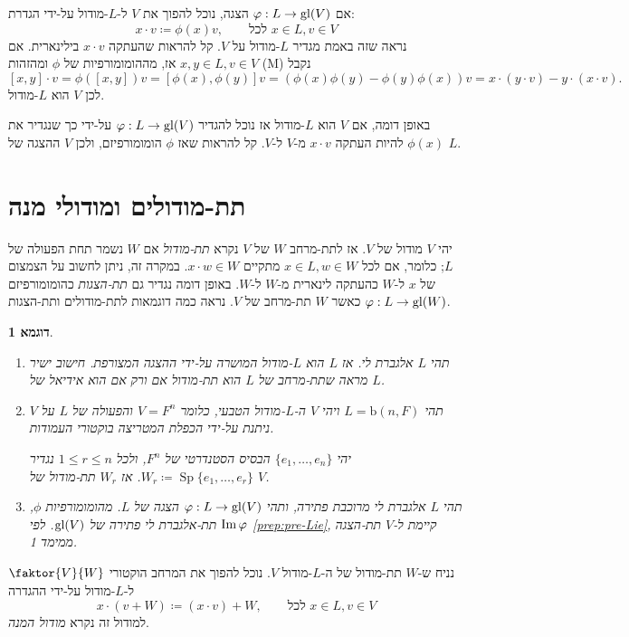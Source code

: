\documentclass{report}
\theoremstyle{break}
\newtheorem{example}[example]{דוגמא}
\theoremstyle{MyNonumberbreak}
\DeclareMathOperator{\Sp}{Sp}
\begin{document}
אם $\varphi : L \to \operatorname{gl}(V)$ הצגה, נוכל להפוך את $V$ ל-$L$-מודול על-ידי הגדרת:
\[ x \cdot v \coloneqq \phi(x)v, \qquad \text{לכל $x \in L, v \in V$} \]
נראה שזה באמת מגדיר $L$-מודול על $V$. קל להראות שהעתקה $x \cdot v$ בילינארית. אם $x, y \in L, v \in V$ אז, מההומומורפיות של $\phi$ ומהזהות (M) נקבל
\[ [x, y] \cdot v = \phi([x, y])v = [\phi(x), \phi(y)]v = (\phi(x)\phi(y) - \phi(y)\phi(x))v = x \cdot (y \cdot v) - y \cdot (x \cdot v). \]
לכן $V$ הוא $L$-מודול.

באופן דומה, אם $V$ הוא $L$-מודול אז נוכל להגדיר $\varphi : L \to \operatorname{gl}(V)$ על-ידי כך שנגדיר את $\phi(x)$ להיות העתקה $x \cdot v$ מ-$V$ ל-$V$. קל להראות שאז $\phi$ הומומורפיזם, ולכן $V$ ההצגה של $L$.

\section{תת-מודולים ומודולי מנה}
יהי $V$ מודול של $V$. אז לתת-מרחב $W$ של $V$ נקרא \textit{תת-מודול} אם $W$ נשמר תחת הפעולה של $L$; כלומר, אם לכל $x \in L, w \in W$ מתקיים $x \cdot w \in W$. במקרה זה, ניתן לחשוב על הצמצום של $x$ ל-$W$ כהעתקה לינארית מ-$W$ ל-$W$. באופן דומה נגדיר גם \textit{תת-הצגות} כהומומורפיזם $\varphi : L \to \operatorname{gl}(W)$ כאשר $W$ תת-מרחב של $V$. נראה כמה דוגמאות לתת-מודולים ותת-הצגות.
\begin{example} \label{exa:sub-modules}
	\begin{enumerate}[label=(\alph*)]
		\item 
		תהי $L$ אלגברת לי. אז $L$ הוא $L$-מודול המושרה על-ידי ההצגה המצורפת. חישוב ישיר מראה שתת-מרחב של $L$ הוא תת-מודול אם ורק אם הוא אידיאל של $L$.
		\item
		תהי $L = \mathrm{b}(n, F)$ ויהי $V$ ה-$L$-מודול הטבעי, כלומר $V = F^n$ והפעולה של $L$ על $V$ ניתנת על-ידי הכפלת המטריצה בוקטורי העמודות.
		
		יהי $\{e_1, \ldots, e_n\}$ הבסיס הסטנדרטי של $F^n$, ולכל $1 \le r \le n$ נגדיר $W_r \coloneqq \Sp\{e_1, \ldots, e_r\}$. אז $W_r$ תת-מודול של $V$.
		\item
		תהי $L$ אלגברת לי מרוכבת פתירה, ותהי $\varphi : L \to \operatorname{gl}(V)$ הצגה של $L$. מהומומורפיות $\phi$, $\operatorname{Im}\varphi$ תת-אלגברת לי פתירה של $\operatorname{gl}(V)$. לפי \autoref*{prep:pre-Lie}, קיימת ל-$V$ תת-הצגה ממימד 1.
	\end{enumerate}
\end{example}
נניח ש-$W$ תת-מודול של ה-$L$-מודול $V$. נוכל להפוך את המרחב הוקטורי $\faktor{V}{W}$ ל-$L$-מודול על-ידי ההגדרה
\[ x \cdot (v + W) \coloneqq (x \cdot v) + W, \qquad \text{לכל $x \in L, v \in V$} \]
למודול זה נקרא \textit{מודול המנה}. \\
\end{document}
